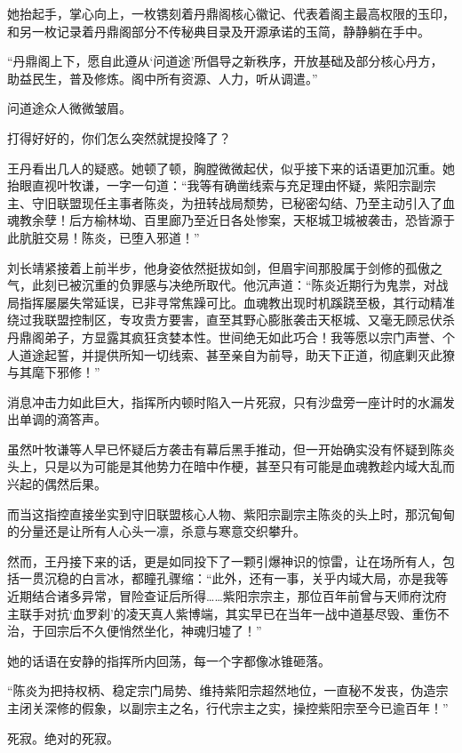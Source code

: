 她抬起手，掌心向上，一枚镌刻着丹鼎阁核心徽记、代表着阁主最高权限的玉印，和另一枚记录着丹鼎阁部分不传秘典目录及开源承诺的玉简，静静躺在手中。

“丹鼎阁上下，愿自此遵从‘问道途’所倡导之新秩序，开放基础及部分核心丹方，助益民生，普及修炼。阁中所有资源、人力，听从调遣。”

问道途众人微微皱眉。

打得好好的，你们怎么突然就提投降了？

王丹看出几人的疑惑。她顿了顿，胸膛微微起伏，似乎接下来的话语更加沉重。她抬眼直视叶牧谦，一字一句道：“我等有确凿线索与充足理由怀疑，紫阳宗副宗主、守旧联盟现任主事者陈炎，为扭转战局颓势，已秘密勾结、乃至主动引入了血魂教余孽！后方榆林坳、百里廊乃至近日各处惨案，天枢城卫城被袭击，恐皆源于此肮脏交易！陈炎，已堕入邪道！”

刘长靖紧接着上前半步，他身姿依然挺拔如剑，但眉宇间那股属于剑修的孤傲之气，此刻已被沉重的负罪感与决绝所取代。他沉声道：“陈炎近期行为鬼祟，对战局指挥屡屡失常延误，已非寻常焦躁可比。血魂教出现时机蹊跷至极，其行动精准绕过我联盟控制区，专攻贵方要害，直至其野心膨胀袭击天枢城、又毫无顾忌伏杀丹鼎阁弟子，方显露其疯狂贪婪本性。世间绝无如此巧合！我等愿以宗门声誉、个人道途起誓，并提供所知一切线索、甚至亲自为前导，助天下正道，彻底剿灭此獠与其麾下邪修！”

消息冲击力如此巨大，指挥所内顿时陷入一片死寂，只有沙盘旁一座计时的水漏发出单调的滴答声。

虽然叶牧谦等人早已怀疑后方袭击有幕后黑手推动，但一开始确实没有怀疑到陈炎头上，只是以为可能是其他势力在暗中作梗，甚至只有可能是血魂教趁内域大乱而兴起的偶然后果。

而当这指控直接坐实到守旧联盟核心人物、紫阳宗副宗主陈炎的头上时，那沉甸甸的分量还是让所有人心头一凛，杀意与寒意交织攀升。

然而，王丹接下来的话，更是如同投下了一颗引爆神识的惊雷，让在场所有人，包括一贯沉稳的白言冰，都瞳孔骤缩：“此外，还有一事，关乎内域大局，亦是我等近期结合诸多异常，冒险查证后所得……紫阳宗宗主，那位百年前曾与天师府沈府主联手对抗‘血罗刹’的凌天真人紫博端，其实早已在当年一战中道基尽毁、重伤不治，于回宗后不久便悄然坐化，神魂归墟了！”

她的话语在安静的指挥所内回荡，每一个字都像冰锥砸落。

“陈炎为把持权柄、稳定宗门局势、维持紫阳宗超然地位，一直秘不发丧，伪造宗主闭关深修的假象，以副宗主之名，行代宗主之实，操控紫阳宗至今已逾百年！”

\vspace{2em}

死寂。绝对的死寂。

